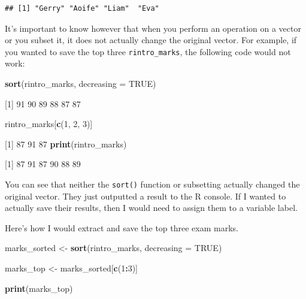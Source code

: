 \documentclass[
]{book}
\newenvironment{Shaded}{\begin{snugshade}}{\end{snugshade}}
\newcommand{\AttributeTok}[1]{\textcolor[rgb]{0.13,0.29,0.53}{#1}}
\newcommand{\ConstantTok}[1]{\textcolor[rgb]{0.56,0.35,0.01}{#1}}
\newcommand{\DecValTok}[1]{\textcolor[rgb]{0.00,0.00,0.81}{#1}}
\newcommand{\FunctionTok}[1]{\textcolor[rgb]{0.13,0.29,0.53}{\textbf{#1}}}
\newcommand{\NormalTok}[1]{#1}
\newcommand{\OtherTok}[1]{\textcolor[rgb]{0.56,0.35,0.01}{#1}}
\newcommand{\SpecialCharTok}[1]{\textcolor[rgb]{0.81,0.36,0.00}{\textbf{#1}}}
\begin{document}
\begin{verbatim}
## [1] "Gerry" "Aoife" "Liam"  "Eva"
\end{verbatim}

It's important to know however that when you perform an operation on a vector or you subset it, it does not actually change the original vector. For example, if you wanted to save the top three \texttt{rintro\_marks}, the following code would not work:

\begin{Shaded}
\begin{Highlighting}[]
\FunctionTok{sort}\NormalTok{(rintro\_marks, }\AttributeTok{decreasing =} \ConstantTok{TRUE}\NormalTok{)}


\NormalTok{[}\DecValTok{1}\NormalTok{] }\DecValTok{91} \DecValTok{90} \DecValTok{89} \DecValTok{88} \DecValTok{87} \DecValTok{87}

\NormalTok{rintro\_marks[}\FunctionTok{c}\NormalTok{(}\DecValTok{1}\NormalTok{, }\DecValTok{2}\NormalTok{, }\DecValTok{3}\NormalTok{)]}

\NormalTok{[}\DecValTok{1}\NormalTok{] }\DecValTok{87} \DecValTok{91} \DecValTok{87}
\FunctionTok{print}\NormalTok{(rintro\_marks)}

\NormalTok{[}\DecValTok{1}\NormalTok{] }\DecValTok{87} \DecValTok{91} \DecValTok{87} \DecValTok{90} \DecValTok{88} \DecValTok{89}
\end{Highlighting}
\end{Shaded}

You can see that neither the \texttt{sort()} function or subsetting actually changed the original vector. They just outputted a result to the R console. If I wanted to actually save their results, then I would need to assign them to a variable label.

Here's how I would extract and save the top three exam marks.

\begin{Shaded}
\begin{Highlighting}[]
\NormalTok{marks\_sorted }\OtherTok{\textless{}{-}} \FunctionTok{sort}\NormalTok{(rintro\_marks, }\AttributeTok{decreasing =} \ConstantTok{TRUE}\NormalTok{)}

\NormalTok{marks\_top }\OtherTok{\textless{}{-}}\NormalTok{ marks\_sorted[}\FunctionTok{c}\NormalTok{(}\DecValTok{1}\SpecialCharTok{:}\DecValTok{3}\NormalTok{)]}

\FunctionTok{print}\NormalTok{(marks\_top)}
\end{Highlighting}
\end{Shaded}
\end{document}
